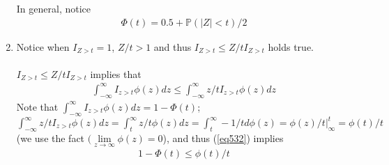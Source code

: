 \begin{exercise}[BH.5.32]
\begin{solution}
\begin{enumerate}
    	\noindent In general, notice 
    	\begin{align*}
    		\Phi(t)=0.5+ \mathbb{P}\left(|Z|<t\right)/2  
    	\end{align*}
     \item   Notice when $I_{Z>t}=1$, $Z/t>1$ and thus $I_{Z>t}\leq Z/t I_{Z>t}$ holds true. \\~\\
    	$I_{Z>t}\leq Z/t I_{Z>t}$ implies that 
    	\begin{align}
    		\int_{-\infty}^{\infty}I_{z>t} \phi(z) dz \leq 	\int_{-\infty}^{\infty}z/tI_{z>t} \phi(z) dz  \label{eq532} 
    	\end{align}
    	Note that $	\int_{-\infty}^{\infty}I_{z>t} \phi(z) dz = 1-\Phi(t)$;~ $\int_{-\infty}^{\infty}z/tI_{z>t} \phi(z) dz = \int_{t}^{\infty}z/t \phi(z) dz = \int_{t}^{\infty}  -1/td\phi(z)=\phi(z)/t|^t_\infty= \phi(t)/t$ (we use the fact $(\lim\limits_{z\rightarrow \infty}\phi(z)=0$), and thus (\ref{eq532}) implies 
    	\begin{align*}
    		1-\Phi(t) \leq \phi(t)/t
    	\end{align*}
	\end{enumerate}
\end{solution}
\end{exercise}


